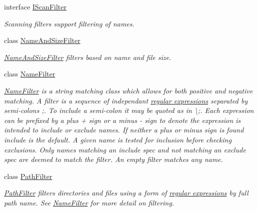 \begin{DoxyCompactItemize}
interface \hyperlink{interface_i_c_sharp_code_1_1_sharp_zip_lib_1_1_core_1_1_i_scan_filter}{I\+Scan\+Filter}
\begin{DoxyCompactList}\small\item\em Scanning filters support filtering of names. \end{DoxyCompactList}\item 
class \hyperlink{class_i_c_sharp_code_1_1_sharp_zip_lib_1_1_core_1_1_name_and_size_filter}{Name\+And\+Size\+Filter}
\begin{DoxyCompactList}\small\item\em \hyperlink{class_i_c_sharp_code_1_1_sharp_zip_lib_1_1_core_1_1_name_and_size_filter}{Name\+And\+Size\+Filter} filters based on name and file size. \end{DoxyCompactList}\item 
class \hyperlink{class_i_c_sharp_code_1_1_sharp_zip_lib_1_1_core_1_1_name_filter}{Name\+Filter}
\begin{DoxyCompactList}\small\item\em \hyperlink{class_i_c_sharp_code_1_1_sharp_zip_lib_1_1_core_1_1_name_filter}{Name\+Filter} is a string matching class which allows for both positive and negative matching. A filter is a sequence of independant \hyperlink{}{regular expressions} separated by semi-\/colons \textquotesingle{};\textquotesingle{}. To include a semi-\/colon it may be quoted as in \textbackslash{};. Each expression can be prefixed by a plus \textquotesingle{}+\textquotesingle{} sign or a minus \textquotesingle{}-\/\textquotesingle{} sign to denote the expression is intended to include or exclude names. If neither a plus or minus sign is found include is the default. A given name is tested for inclusion before checking exclusions. Only names matching an include spec and not matching an exclude spec are deemed to match the filter. An empty filter matches any name. \end{DoxyCompactList}\item 
class \hyperlink{class_i_c_sharp_code_1_1_sharp_zip_lib_1_1_core_1_1_path_filter}{Path\+Filter}
\begin{DoxyCompactList}\small\item\em \hyperlink{class_i_c_sharp_code_1_1_sharp_zip_lib_1_1_core_1_1_path_filter}{Path\+Filter} filters directories and files using a form of \hyperlink{}{regular expressions} by full path name. See \hyperlink{class_i_c_sharp_code_1_1_sharp_zip_lib_1_1_core_1_1_name_filter}{Name\+Filter} for more detail on filtering. \end{DoxyCompactList}\item 

\end{DoxyCompactItemize}

